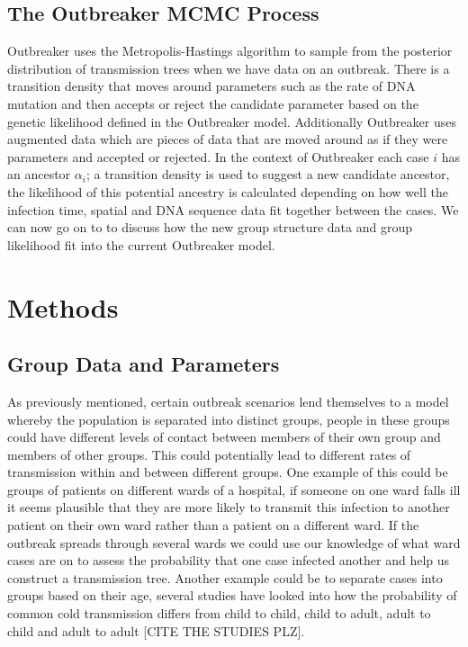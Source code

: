 \documentclass[11pt,a4paper]{report}
\begin{document}
\section{The Outbreaker MCMC Process}
Outbreaker uses the Metropolis-Hastings algorithm to sample from the posterior distribution of transmission trees when we have data on an outbreak. There is a transition density that moves around parameters such as the rate of DNA mutation and then accepts or reject the candidate parameter based on the genetic likelihood defined in the Outbreaker model. Additionally Outbreaker uses augmented data which are pieces of data that are moved around as if they were parameters and accepted or rejected. In the context of Outbreaker each case $i$ has an ancestor $\alpha_i$; a transition density is used to suggest a new candidate ancestor, the likelihood of this potential ancestry is calculated depending on how well the infection time, spatial and DNA sequence data fit together between the cases. We can now go on to to discuss how the new group structure data and group likelihood fit into the current Outbreaker model.


\chapter{Methods}
\section{Group Data and Parameters}
As previously mentioned, certain outbreak scenarios lend themselves to a model whereby the population is separated into distinct groups, people in these groups could have different levels of contact between members of their own group and members of other groups. This could potentially lead to different rates of transmission within and between different groups. One example of this could be groups of patients on different wards of a hospital, if someone on one ward falls ill it seems plausible that they are more likely to transmit this infection to another patient on their own ward rather than a patient on a different ward. If the outbreak spreads through several wards we could use our knowledge of what ward cases are on to assess the probability that one case infected another and help us construct a transmission tree. Another example could be to separate cases into groups based on their age, several studies have looked into how the probability of common cold transmission differs from child to child, child to adult, adult to child and adult to adult [CITE THE STUDIES PLZ].
\end{document}
